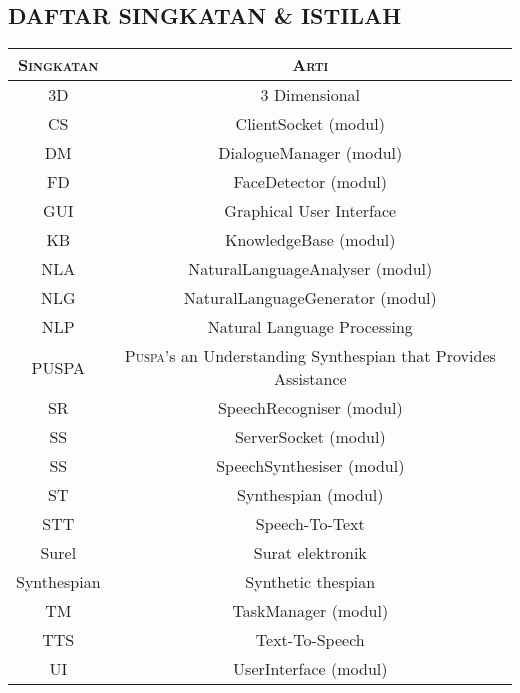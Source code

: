 \subsection*{\textcolor{subsectioncolor}{\textsf{DAFTAR SINGKATAN \& ISTILAH}}}

\begin{tabular}{|c|c|}
\hline
{\scshape Singkatan} & {\scshape Arti}\\
\hline
3D & 3 Dimensional\\
\hline
CS & ClientSocket (modul)\\
\hline
DM & DialogueManager (modul)\\
\hline
FD & FaceDetector (modul)\\
\hline
GUI & Graphical User Interface\\
\hline
KB & KnowledgeBase (modul)\\
\hline
NLA & NaturalLanguageAnalyser (modul)\\
\hline
NLG & NaturalLanguageGenerator (modul)\\
\hline
NLP & Natural Language Processing\\
\hline
PUSPA & {\scshape Puspa}'s an Understanding Synthespian that Provides Assistance\\
\hline
SR & SpeechRecogniser (modul)\\
\hline
SS & ServerSocket (modul)\\
\hline
SS & SpeechSynthesiser (modul)\\
\hline
ST & Synthespian (modul)\\
\hline
STT & Speech-To-Text\\
\hline
Surel & Surat elektronik\\
\hline
Synthespian & Synthetic thespian\\
\hline
TM & TaskManager (modul)\\
\hline
TTS & Text-To-Speech\\
\hline
UI & UserInterface (modul)\\
\hline
\end{tabular}
